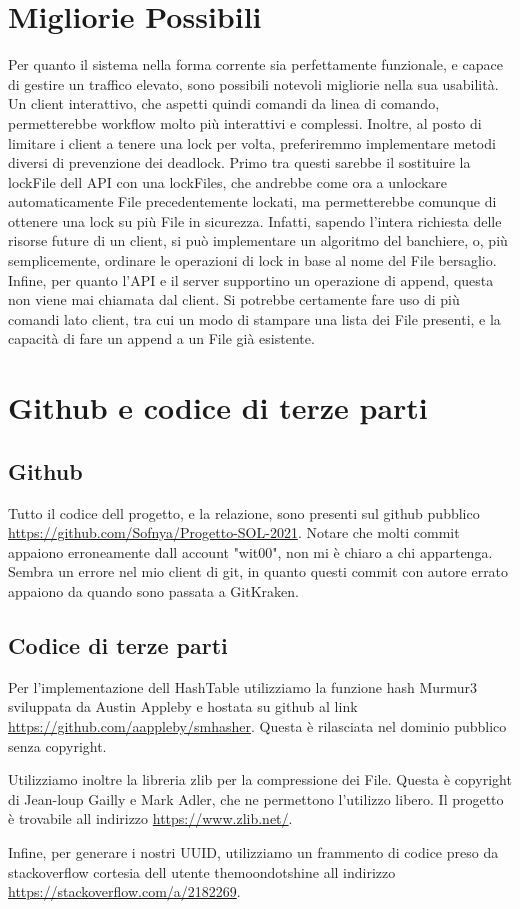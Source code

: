 \documentclass[11pt]{article}
\begin{document}
\begin{flushleft}
\section{Migliorie Possibili}

Per quanto il sistema nella forma corrente sia perfettamente funzionale, e capace di gestire un traffico elevato, sono possibili notevoli migliorie nella sua usabilità.
Un client interattivo, che aspetti quindi comandi da linea di comando, permetterebbe workflow molto più interattivi e complessi.
Inoltre, al posto di limitare i client a tenere una lock per volta, preferiremmo implementare metodi diversi di prevenzione dei deadlock. Primo tra questi sarebbe il sostituire la lockFile dell API con una lockFiles, che andrebbe come ora a unlockare automaticamente File precedentemente lockati, ma permetterebbe comunque di ottenere una lock su più File in sicurezza. Infatti, sapendo l'intera richiesta delle risorse future di un client, si può implementare un algoritmo del banchiere, o, più semplicemente, ordinare le operazioni di lock in base al nome del File bersaglio.
Infine, per quanto l'API e il server supportino un operazione di append, questa non viene mai chiamata dal client. Si potrebbe certamente fare uso di più comandi lato client, tra cui un modo di stampare una lista dei File presenti, e la capacità di fare un append a un File già esistente.

\section{Github e codice di terze parti}
\subsection{Github}
Tutto il codice dell progetto, e la relazione, sono presenti sul github pubblico \url{https://github.com/Sofnya/Progetto-SOL-2021}.
Notare che molti commit appaiono erroneamente dall account "wit00", non mi è chiaro a chi appartenga. Sembra un errore nel mio client di git, in quanto questi commit con autore errato appaiono da quando sono passata a GitKraken.

\subsection{Codice di terze parti}
Per l'implementazione dell HashTable utilizziamo la funzione hash Murmur3 sviluppata da Austin Appleby e hostata su github al link \url{https://github.com/aappleby/smhasher}. Questa è rilasciata nel dominio pubblico senza copyright.

Utilizziamo inoltre la libreria zlib per la compressione dei File. Questa è copyright di Jean-loup Gailly e Mark Adler, che ne permettono l'utilizzo libero. Il progetto è trovabile all indirizzo \url{https://www.zlib.net/}.

Infine, per generare i nostri UUID, utilizziamo un frammento di codice preso da stackoverflow cortesia dell utente themoondotshine all indirizzo \url{https://stackoverflow.com/a/2182269}.

\end{flushleft}
\end{document}
